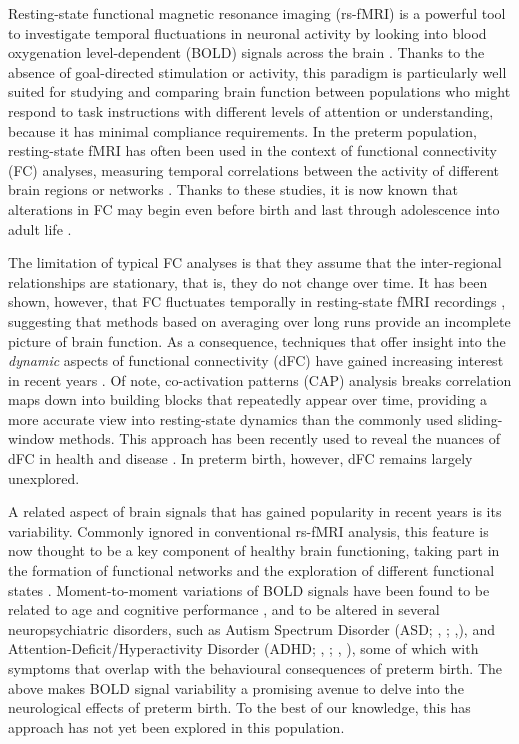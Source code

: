      Resting-state functional magnetic resonance imaging (rs-fMRI) is a powerful tool to investigate temporal fluctuations in neuronal activity by looking into  blood oxygenation level-dependent (BOLD) signals across the brain \citep{Fox2007}. Thanks to the absence of goal-directed stimulation or activity, this paradigm is particularly well suited for studying and comparing brain function between populations who might respond to task instructions with different levels of attention or understanding, because it has minimal compliance requirements. In the preterm population, resting-state fMRI has often been used in the context of functional connectivity (FC) analyses, measuring temporal correlations between the activity of different brain regions or networks \citep{Lordier2019}. Thanks to these studies, it is now known that alterations in FC may begin even before birth \citep{Thomason2017} and last through adolescence \citep{Wehrle2018} into adult life \citep{Papini2016}. 

  The limitation of typical FC analyses is that they assume that the inter-regional relationships are stationary, that is, they do not change over time. It has been shown, however, that FC fluctuates temporally in resting-state fMRI recordings \citep{Chang2010}, suggesting that methods based on averaging over long runs provide an incomplete picture of brain function. As a consequence, techniques that offer insight into the \textit{dynamic} aspects of functional connectivity (dFC) have gained increasing interest in recent years \citep{Preti2016}. Of note, co-activation patterns (CAP) analysis \citep{Liu2018} breaks correlation maps down into building blocks that repeatedly appear over time, providing a more accurate view into resting-state dynamics than the commonly used sliding-window methods. This approach has been recently used to reveal the nuances of dFC in health and disease \citep{Kaiser2019}. In preterm birth, however, dFC remains largely unexplored.
  
   A related aspect of brain signals that has gained popularity in recent years is its variability. Commonly ignored in conventional rs-fMRI analysis, this feature is now thought to be a key component of healthy brain functioning, taking part in the formation of functional networks \citep{Fuchs2007} and the exploration of different functional states \citep{Ghosh2008, McIntosh2010}. Moment-to-moment variations of BOLD signals have been found to be related to age and cognitive performance \citep{Garrett2013}, and to be altered in several neuropsychiatric disorders, such as Autism Spectrum Disorder (ASD; \citeauthor{DiMartino2014}, \citeyear{DiMartino2014}; \citeauthor{Easson2019},\citeyear{Easson2019}), and  Attention-Deficit/Hyperactivity Disorder (ADHD; \citeauthor{Zang2007}, \citeyear{Zang2007}; \citeauthor{Nomi2018}, \citeyear{Nomi2018}), some of which with symptoms that overlap with the behavioural consequences of preterm birth. The above makes BOLD signal variability a promising avenue to delve into the neurological effects of preterm birth. To the best of our knowledge, this has approach has not yet been explored in this population.

